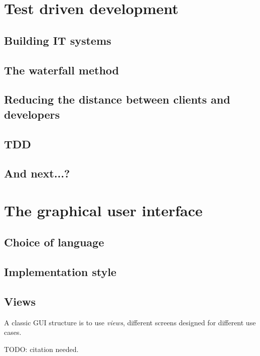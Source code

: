 \documentclass[10pt]{article}
\begin{document}
\section{Test driven development} \label{tdd}

\subsection{Building IT systems}

\subsection{The waterfall method}

\subsection{Reducing the distance between clients and developers}

\subsection{TDD}

\subsection{And next...?}






\section{The graphical user interface} \label{gui}

\subsection{Choice of language}

\subsection{Implementation style}

\subsection{Views}
A classic GUI structure is to use \emph{views}, different screens designed for different use cases.
 
TODO: citation needed.
\end{document}
